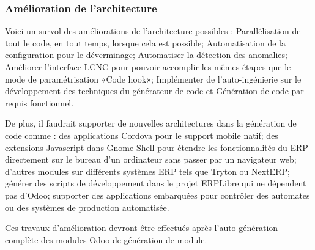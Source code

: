 \subsubsection{Amélioration de l’architecture}

Voici un survol des améliorations de l'architecture possibles : Parallélisation de tout le code, en tout temps, lorsque cela est possible; Automatisation de la configuration pour le déverminage; Automatiser la détection des anomalies; Améliorer l’interface LCNC pour pouvoir accomplir les mêmes étapes que le mode de paramétrisation «Code hook»; Implémenter de l'auto-ingénierie sur le développement des techniques du générateur de code et Génération de code par requis fonctionnel.

De plus, il faudrait supporter de nouvelles architectures dans la génération de code comme : des applications Cordova pour le support mobile natif;  des extensions Javascript dans Gnome Shell pour étendre les fonctionnalités du ERP directement sur le bureau d’un ordinateur sans passer par un navigateur web; d'autres modules sur différents systèmes ERP tels que Tryton ou NextERP; générer des scripts de développement dans le projet ERPLibre qui ne dépendent pas d’Odoo; supporter des applications embarquées pour contrôler des automates ou des systèmes de production automatisée.






Ces travaux d’amélioration devront être effectués après l’auto-génération complète des modules Odoo de génération de module.

